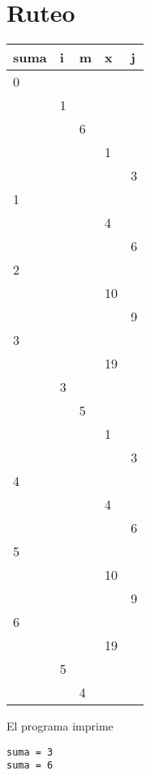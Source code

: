 \section{Ruteo}
\begin{table}[H]
\begin{tabular}{|l|l|l|l|l|}
\hline
suma & i & m & x  & j \\ \hline
0    &   &   &    &   \\ \hline
     & 1 &   &    &   \\ \hline
     &   & 6 &    &   \\ \hline
     &   &   & 1  &   \\ \hline
     &   &   &    & 3 \\ \hline
1    &   &   &    &   \\ \hline
     &   &   & 4  &   \\ \hline
     &   &   &    & 6 \\ \hline
2    &   &   &    &   \\ \hline
     &   &   & 10 &   \\ \hline
     &   &   &    & 9 \\ \hline
3    &   &   &    &   \\ \hline
     &   &   & 19 &   \\ \hline
     & 3 &   &    &   \\ \hline
     &   & 5 &    &   \\ \hline
     &   &   & 1  &   \\ \hline
     &   &   &    & 3 \\ \hline
4    &   &   &    &   \\ \hline
     &   &   & 4  &   \\ \hline
     &   &   &    & 6 \\ \hline
5    &   &   &    &   \\ \hline
     &   &   & 10 &   \\ \hline
     &   &   &    & 9 \\ \hline
6    &   &   &    &   \\ \hline
     &   &   & 19 &   \\ \hline
     & 5 &   &    &   \\ \hline
     &   & 4 &    &   \\ \hline
\end{tabular}
\end{table}

El programa imprime

\begin{lstlisting}[style=consola]
suma = 3
suma = 6
\end{lstlisting}